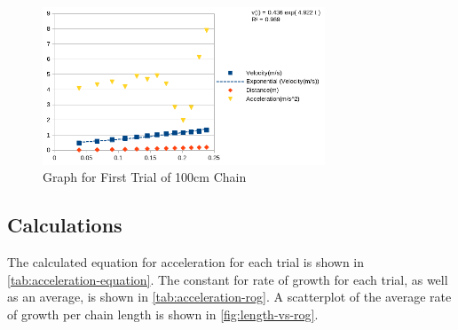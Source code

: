\documentclass[stu,biblatex,floatsintext,draftall]{apa7}
\begin{document}
\begin{figure}[H]
	\centering
	\caption{Graph for First Trial of 100\unit{\centi\meter} Chain}
	\label{fig:100-trial1}
	\includegraphics[width=0.75\textwidth]{100-trial1}
\end{figure}

\subsection{Calculations}
The calculated equation for acceleration for each trial is shown in \autoref{tab:acceleration-equation}. The constant for rate of growth for each trial, as well as an average, is shown in \autoref{tab:acceleration-rog}. A scatterplot of the average rate of growth per chain length is shown in \autoref{fig:length-vs-rog}.
\end{document}
